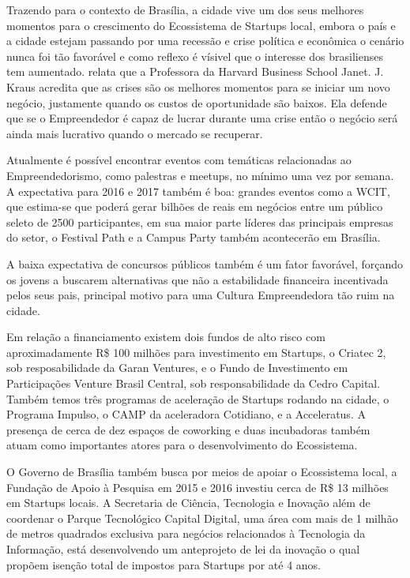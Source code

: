 Trazendo para o contexto de Brasília, a cidade vive um dos seus melhores momentos para o crescimento do Ecossistema de Startups local, embora o país e a cidade estejam passando por uma recessão e crise política e econômica o cenário nunca foi tão favorável e como reflexo é vísivel que o interesse dos brasilienses tem aumentado.  relata que a Professora da Harvard Business School Janet. J. Kraus acredita que as crises são os melhores momentos para se iniciar um novo negócio, justamente quando os custos de oportunidade são baixos. Ela defende que se o Empreendedor é capaz de lucrar durante uma crise então o negócio será ainda mais lucrativo quando o mercado se recuperar.

Atualmente é possível encontrar eventos com temáticas relacionadas ao Empreendedorismo, como palestras e meetups, no mínimo uma vez por semana. A expectativa para 2016 e 2017 também é boa: grandes eventos como a WCIT, que estima-se que poderá gerar bilhões de reais em negócios entre um público seleto de 2500 participantes, em sua maior parte líderes das principais empresas do setor, o Festival Path e a Campus Party também acontecerão em Brasília. 

A baixa expectativa de concursos públicos também é um fator favorável, forçando os jovens a buscarem alternativas que não a estabilidade financeira incentivada pelos seus pais, principal motivo para uma Cultura Empreendedora tão ruim na cidade. 

Em relação a financiamento existem dois fundos de alto risco com aproximadamente R\$ 100 milhões para investimento em Startups, o Criatec 2, sob resposabilidade da Garan Ventures, e o Fundo de Investimento em Participações Venture Brasil Central, sob responsabilidade da Cedro Capital. Também temos três programas de aceleração de Startups rodando na cidade, o Programa Impulso, o CAMP da aceleradora Cotidiano, e a Acceleratus. A presença de cerca de dez espaços de coworking e duas incubadoras também atuam como importantes atores para o desenvolvimento do Ecossistema.

O Governo de Brasília também busca por meios de apoiar o Ecossistema local, a Fundação de Apoio à Pesquisa em 2015 e 2016 investiu cerca de R\$ 13 milhões em Startups locais. A Secretaria de Ciência, Tecnologia e Inovação além de coordenar o Parque Tecnológico Capital Digital, uma área com mais de 1 milhão de metros quadrados exclusiva para negócios relacionados à Tecnologia da Informação, está desenvolvendo um anteprojeto de lei da inovação o qual propõem isenção total de impostos para Startups por até 4 anos. 

